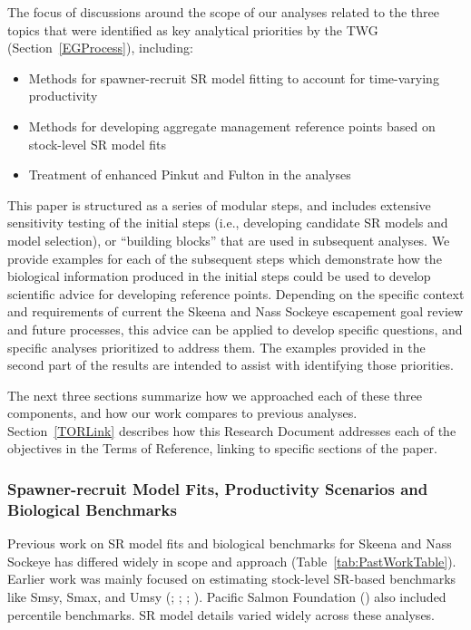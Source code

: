 \documentclass[french,11pt]{book}
\begin{document}
The focus of discussions around the scope of our analyses related to the three topics that were identified as key analytical priorities by the TWG (Section~\ref{EGProcess}), including:
\begin{itemize}

\item
  Methods for spawner-recruit SR model fitting to account for time-varying productivity
\item
  Methods for developing aggregate management reference points based on stock-level SR model fits
\item
  Treatment of enhanced Pinkut and Fulton in the analyses
\end{itemize}
This paper is structured as a series of modular steps, and includes extensive sensitivity testing of the initial steps (i.e., developing candidate SR models and model selection), or ``building blocks'' that are used in subsequent analyses. We provide examples for each of the subsequent steps which demonstrate how the biological information produced in the initial steps could be used to develop scientific advice for developing reference points. Depending on the specific context and requirements of current the Skeena and Nass Sockeye escapement goal review and future processes, this advice can be applied to develop specific questions, and specific analyses prioritized to address them. The examples provided in the second part of the results are intended to assist with identifying those priorities.

The next three sections summarize how we approached each of these three components, and how our work compares to previous analyses. Section~\ref{TORLink} describes how this Research Document addresses each of the objectives in the Terms of Reference, linking to specific sections of the paper.

\subsubsection{Spawner-recruit Model Fits, Productivity Scenarios and Biological Benchmarks}\label{AnalysisOverviewSR}

Previous work on SR model fits and biological benchmarks for Skeena and Nass Sockeye has differed widely in scope and approach (Table~\ref{tab:PastWorkTable}). Earlier work was mainly focused on estimating stock-level SR-based benchmarks like Smsy, Smax, and Umsy (; ; ; ). Pacific Salmon Foundation () also included percentile benchmarks. SR model details varied widely across these analyses.
\end{document}
